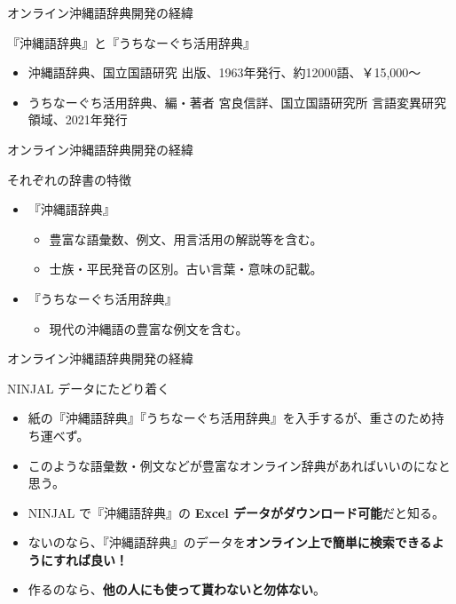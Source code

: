 \documentclass[14pt]{beamer}
\begin{document}


\begin{frame}{オンライン沖縄語辞典開発の経緯}
  \begin{block}{『沖縄語辞典』と『うちなーぐち活用辞典』}
    \begin{itemize}
    \item 沖縄語辞典、国立国語研究 出版、1963年発行、約12000語、￥15,000〜
    \item うちなーぐち活用辞典、編・著者 宮良信詳、国立国語研究所 言語変異研究領域、2021年発行
    \end{itemize}
  \end{block}
\end{frame}

\begin{frame}{オンライン沖縄語辞典開発の経緯}
  \begin{block}{それぞれの辞書の特徴}
    \begin{itemize}
    \item 『沖縄語辞典』
      \begin{itemize}
      \item 豊富な語彙数、例文、用言活用の解説等を含む。
      \item 士族・平民発音の区別。古い言葉・意味の記載。
      \end{itemize}
    \item 『うちなーぐち活用辞典』
      \begin{itemize}
      \item 現代の沖縄語の豊富な例文を含む。
      \end{itemize}
    \end{itemize}
  \end{block}  
\end{frame}


\begin{frame}{オンライン沖縄語辞典開発の経緯}
  \begin{block}{NINJAL データにたどり着く}
    \begin{itemize}
    \item 紙の『沖縄語辞典』『うちなーぐち活用辞典』を入手するが、重さのため持ち運べず。
    \item このような語彙数・例文などが豊富なオンライン辞典があればいいのになと思う。
    \item NINJAL で『沖縄語辞典』の \textbf{Excel データがダウンロード可能}だと知る。
    \item ないのなら、『沖縄語辞典』のデータを\textbf{オンライン上で簡単に検索できるようにすれば良い！}
    \item 作るのなら、\textbf{他の人にも使って貰わないと勿体ない}。      
    \end{itemize}
  \end{block}
\end{frame}
\end{document}
